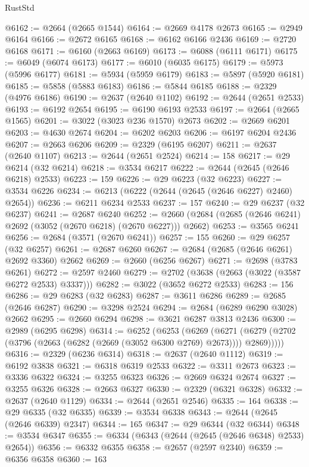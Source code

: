 \begin{lexlean}{RustStd}
\begin{coremodule}
@6162 := @2664 (@2665 @1544)
@6164 := @2669 @4178 @2673
@6165 := @2949 @6164
@6166 := @2672 @6165
@6168 := @6162 @6166 @2436
@6169 := @2720 @6168
@6171 := @6160 (@2663 @6169)
@6173 := @6088 (@6111 @6171)
@6175 := @6049 (@6074 @6173)
@6177 := @6010 (@6035 @6175)
@6179 := @5973 (@5996 @6177)
@6181 := @5934 (@5959 @6179)
@6183 := @5897 (@5920 @6181)
@6185 := @5858 (@5883 @6183)
@6186 := @5844 @6185
@6188 := @2329 (@4976 @6186)
@6190 := @2637 (@2640 @1102)
@6192 := @2644 (@2651 @2533)
@6193 := @6192 @2654
@6195 := @6190 @6193 @2533
@6197 := @2664 (@2665 @1565)
@6201 := @3022 (@3023 @236 @1570) @2673
@6202 := @2669 @6201
@6203 := @4630 @2674
@6204 := @6202 @6203
@6206 := @6197 @6204 @2436
@6207 := @2663 @6206
@6209 := @2329 (@6195 @6207)
@6211 := @2637 (@2640 @1107)
@6213 := @2644 (@2651 @2524)
@6214 := 158
@6217 := @29 @6214 (@32 @6214)
@6218 := @3534 @6217
@6222 := @2644 (@2645 (@2646 @6218) @2533)
@6223 := 159
@6226 := @29 @6223 (@32 @6223)
@6227 := @3534 @6226
@6234 := @6213 (@6222 (@2644 (@2645 (@2646 @6227) @2460) @2654))
@6236 := @6211 @6234 @2533
@6237 := 157
@6240 := @29 @6237 (@32 @6237)
@6241 := @2687 @6240
@6252 := @2660 (@2684 (@2685 (@2646 @6241) @2692 (@3052 (@2670 @6218) (@2670 @6227))) @2662)
@6253 := @3565 @6241
@6256 := @2684 (@3571 (@2670 @6241))
@6257 := 155
@6260 := @29 @6257 (@32 @6257)
@6261 := @2687 @6260
@6267 := @2684 (@2685 (@2646 @6261) @2692 @3360) @2662
@6269 := @2660 (@6256 @6267)
@6271 := @2698 (@3783 @6261)
@6272 := @2597 @2460
@6279 := @2702 (@3638 (@2663 (@3022 (@3587 @6272 @2533) @3337)))
@6282 := @3022 (@3652 @6272 @2533)
@6283 := 156
@6286 := @29 @6283 (@32 @6283)
@6287 := @3611 @6286
@6289 := @2685 (@2646 @6287)
@6290 := @3298 @2524
@6294 := @2684 (@6289 @6290 @3028) @2662
@6295 := @2660 @6294
@6298 := @3621 @6287 @3813 @2436
@6300 := @2989 (@6295 @6298)
@6314 := @6252
    (@6253
      (@6269
        (@6271 (@6279 (@2702 (@3796 (@2663 (@6282 (@2669 (@3052 @6300 @2769) @2673)))) @2869)))))
@6316 := @2329 (@6236 @6314)
@6318 := @2637 (@2640 @1112)
@6319 := @6192 @3838
@6321 := @6318 @6319 @2533
@6322 := @3311 @2673
@6323 := @3336 @6322
@6324 := @3255 @6323
@6326 := @2669 @6324 @2674
@6327 := @3255 @6326
@6328 := @2663 @6327
@6330 := @2329 (@6321 @6328)
@6332 := @2637 (@2640 @1129)
@6334 := @2644 (@2651 @2546)
@6335 := 164
@6338 := @29 @6335 (@32 @6335)
@6339 := @3534 @6338
@6343 := @2644 (@2645 (@2646 @6339) @2347)
@6344 := 165
@6347 := @29 @6344 (@32 @6344)
@6348 := @3534 @6347
@6355 := @6334 (@6343 (@2644 (@2645 (@2646 @6348) @2533) @2654))
@6356 := @6332 @6355
@6358 := @2657 (@2597 @2340)
@6359 := @6356 @6358
@6360 := 163

\end{coremodule}
\end{lexlean}
